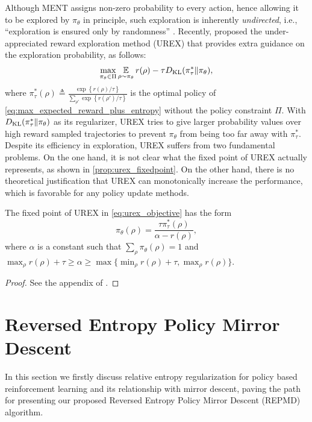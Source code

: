 \documentclass{article} %
\begin{document}
Although MENT assigns non-zero probability to every action, hence allowing it to be explored by $\pi_\theta$ in principle, such exploration is inherently \textit{undirected}, i.e., ``exploration is ensured only by randomness'' \citep{thrun1992efficient}. 
Recently, \citet{nachum2017improving} proposed the under-appreciated reward exploration method (UREX) that provides extra guidance on the exploration probability, as follows:
\begin{equation}
\label{eq:urex_objective}
\begin{split}
	\max\limits_{\pi_\theta \in \Pi}{ \operatorname*{\mathbb{E}}\limits_{\rho \sim \pi_\theta}{  r(\rho)  - \tau D_{\mathrm{KL}}(\pi_\tau^* \| \pi_\theta) } },
\end{split}
\end{equation}
where $\pi_\tau^*(\rho) \triangleq \frac{\exp\left\{ r(\rho) / \tau \right\}}{ \sum_{\rho'}{ \exp\left\{ r(\rho') / \tau \right\} } }$ is the optimal policy of \cref{eq:max_expected_reward_plus_entropy} without the policy constraint $\Pi$. With $D_{\mathrm{KL}}(\pi_\tau^* \| \pi_\theta)$ as its regularizer, UREX tries to give larger probability values over high reward sampled trajectories to prevent $\pi_\theta$ from being too far away with $\pi_\tau^*$. Despite its efficiency in exploration, UREX suffers from two fundamental problems. On the one hand, it is not clear what the fixed point of UREX actually represents, as shown in \cref{prop:urex_fixedpoint}. On the other hand, there is no theoretical justification that UREX can monotonically increase the performance, which is favorable for any policy update methods. 
\begin{prop}
\label{prop:urex_fixedpoint}
The fixed point of UREX in \cref{eq:urex_objective} has the form
\begin{equation*}
	\pi_\theta(\rho) = \frac{\tau \pi_\tau^*(\rho)}{\alpha - r(\rho)},
\end{equation*}
where $\alpha$ is a constant such that $\sum_{\rho}{ \pi_\theta(\rho)} = 1$ and $ \max_{\rho}{ r(\rho) } + \tau \ge \alpha \ge  \max\{\min_{\rho}{ r(\rho) } + \tau, \max_{\rho}{ r(\rho) } \}$.
\end{prop}
\begin{proof}
See the appendix of \citet{nachum2017improving}.
\end{proof}

\section{Reversed Entropy Policy Mirror Descent}
\label{sec:reversed_emtropy_policy_mirror_descent}
In this section we firstly discuss relative entropy regularization for policy based reinforcement learning and its relationship with mirror descent, paving the path for presenting our proposed Reversed Entropy Policy Mirror Descent (REPMD) algorithm. 
\end{document}

